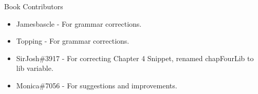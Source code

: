 \large Book Contributors \newline
\begin{itemize}
	\item Jamesbascle - For grammar corrections.
	\item Topping - For grammar corrections.
	\item SirJosh\#3917 - For correcting Chapter 4 Snippet, renamed chapFourLib to lib variable.
	\item Monica\#7056 - For suggestions and improvements.
\end{itemize}

\newpage